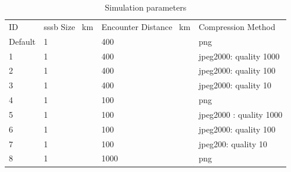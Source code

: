 \begin{table}[htpb]
\caption{Simulation parameters}
\label{tab:sim_params}
\begin{tabular}{l|lll}
ID      & \gls{sssb} Size \SI{}{\kilo\meter} & Encounter Distance \SI{}{\kilo\meter} & Compression Method      \\
Default & 1                                                                                                        & 400                                                                                          & png                     \\
1       & 1                                                                                                        & 400                                                                                          & jpeg2000: quality 1000  \\
2       & 1                                                                                                        & 400                                                                                          & jpeg2000: quality 100   \\
3       & 1                                                                                                        & 400                                                                                          & jpeg2000: quality 10    \\
4       & 1                                                                                                        & 100                                                                                          & png                     \\
5       & 1                                                                                                        & 100                                                                                          & jpeg2000 : quality 1000 \\
6       & 1                                                                                                        & 100                                                                                          & jpeg2000: quality 100   \\
7       & 1                                                                                                        & 100                                                                                          & jpeg200: quality 10     \\
8       & 1                                                                                                        & 1000                                                                                         & png                     \\

\end{tabular}
\end{table}
